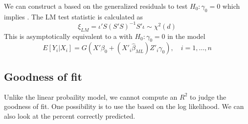 We can construct a  based on the generalized residuals to test $H_0: \gamma_0=0$ which implies .
The LM test statistic is calculated as 
\begin{equation*}
    \xi_{LM} = \iota'S(S'S)^{-1}S'\iota\sim\chi^2(d)
\end{equation*}
This is asymptotically equivalent to a  with $H_0: \gamma_0=0$ in the model 
\begin{equation*}
    E[Y_i|X_i] = G(X'\beta_0 + (X'_i\hat{\beta}_{ML})Z'_i\gamma_0),\quad i=1,\ldots,n
\end{equation*}

\subsection{Goodness of fit}
Unlike the linear probaility model, we cannot compute an $R^2$ to judge the goodness of fit.
One possibility is to use the  based on the log likelihood. We can also look at the percent correctly predicted.


